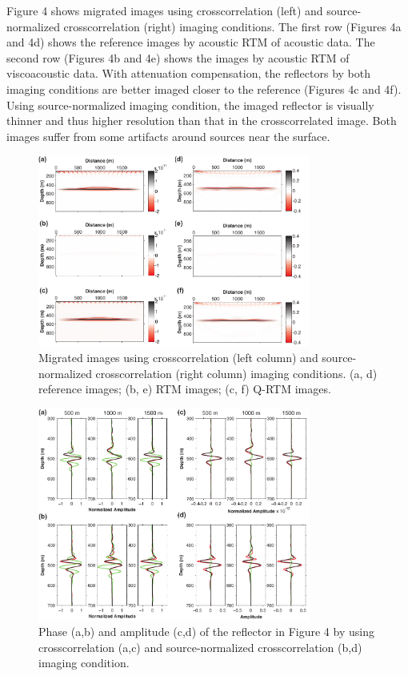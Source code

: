 Figure 4 shows migrated images using crosscorrelation (left) and source-normalized crosscorrelation (right) imaging conditions. The first row (Figures 4a and 4d) shows the reference images by acoustic RTM of acoustic data. The second row (Figures 4b and 4e) shows the images by acoustic RTM of viscoacoustic data. With attenuation compensation, the reflectors by both imaging conditions are better imaged closer to the reference (Figures 4c and 4f). Using source-normalized imaging condition, the imaged reflector is visually thinner and thus higher resolution than that in the crosscorrelated image. Both images suffer from some artifacts around sources near the surface.

 \begin{figure}[!htb]
   \centering
   \includegraphics[width=0.8\textwidth]{Fig/fig4-eps-converted-to}
   \caption{Migrated images using crosscorrelation (left column) and source-normalized crosscorrelation (right column) imaging conditions. (a, d) reference images; (b, e) RTM images; (c, f) Q-RTM images. }
 \end{figure}

 \begin{figure}[!htb]
   \centering
   \includegraphics[width=0.8\textwidth]{Fig/fig5-eps-converted-to}
   \caption{Phase (a,b) and amplitude (c,d) of the reflector in Figure 4 by using crosscorrelation (a,c) and source-normalized crosscorrelation (b,d) imaging condition. }
 \end{figure}

